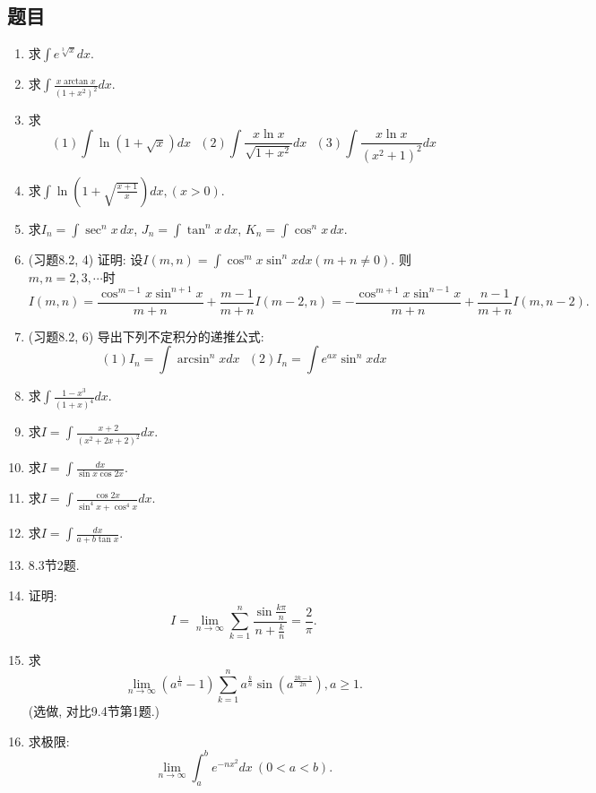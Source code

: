 \documentclass[UTF8,11pt, a4paper, oneside, fontset=none]{ctexbook}
\begin{document}
\subsection*{题目}
\begin{enumerate}
\item 求$\int e^{\sqrt[3]{x}}dx $.
\item 求$\int \frac{x \arctan x}{(1 + x^2)^2}dx$.

\item 求
\[
(1) \int \ln(1 + \sqrt x)dx \ \ \ (2) \int \frac{x \ln x}{\sqrt{1 + x^2}}dx \ \ \ (3) \int \frac{x \ln x}{(x^2 + 1)^2}dx
\]

\item 求$\int \ln \left( 1 + \sqrt{\frac{x+1}{x}}\right)dx, (x > 0)$.

\item 求$I_n = \int \sec^n x\,dx$, $J_n = \int \tan^n x\,dx$, $K_n = \int \cos^n x\,dx$.

\item (习题8.2, 4) 证明: 设$I(m, n) = \int \cos^m x \sin^n x dx (m + n \neq 0)$. 则$m, n = 2, 3, \cdots $时
\[
I(m, n) = \frac{\cos^{m-1}x \sin^{n+1}x}{m+n} + \frac{m-1}{m+n} I(m-2, n) = - \frac{\cos^{m+1}x \sin^{n-1}x}{m+n} + \frac{n-1}{m+n} I(m, n-2).
\]

\item (习题8.2, 6) 导出下列不定积分的递推公式:
\[
(1) I_n = \int \arcsin^n x dx \ \ \ (2) I_n = \int e^{ax} \sin^n x dx
\]

\item 求$\int \frac{1-x^3}{(1 + x)^4}dx$.

\item 求$I = \int \frac{x+2}{(x^2 + 2x + 2)^2}dx$.

\item 求$I = \int \frac{dx}{\sin x \cos 2 x}$.

\item 求$I = \int \frac{\cos 2x}{\sin^4 x + \cos^4 x}dx$.

\item 求$I = \int \frac{dx}{a + b \tan x}$.

\item 8.3节2题.

\item 证明:
\[
I = \lim_{n \to \infty} \sum_{k=1}^n \frac{\sin \frac{k\pi}{n}}{ n + \frac{k}{n}} = \frac{2}{\pi}.
\]
\item 求
\[
\lim_{n \to \infty} (a^{\frac{1}{n}} -1 ) \sum_{k=1}^n a^{\frac{k}{n}} \sin \left( a^{\frac{2k-1}{2n}} \right), a \geq 1.
\]
(选做, 对比9.4节第1题.)
\item 求极限:
\[
\lim_{n \to \infty} \int_a^b e^{-nx^2} dx \ ( 0 < a < b).
\]

\end{enumerate}
\clearpage
\end{document}
